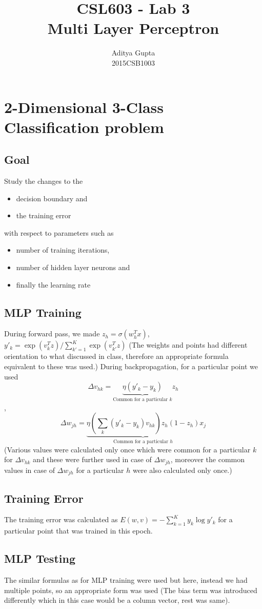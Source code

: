 \documentclass{article}
\title{CSL603 - Lab 3\\Multi Layer Perceptron}
\author{Aditya Gupta\\2015CSB1003}
\begin{document}
\maketitle
\section{2-Dimensional 3-Class Classification problem}
\subsection{Goal} Study the changes to the 
\begin{itemize}
\item decision boundary and 
\item the training error
\end{itemize} with respect to parameters such as 
\begin{itemize}
\item number of training iterations,
\item number of hidden layer neurons and
\item finally the learning rate
\end{itemize}
\subsection{MLP Training}
During forward pass, we made $z_h=\sigma(w_h^Tx)$, $y'_k=\exp(v_k^Tz)/\sum_{k'=1}^K \exp(v_{k'}^Tz)$ (The weights and points had different orientation to what discussed in class, therefore an appropriate formula equivalent to these was used.)
During backpropagation, for a particular point we used $$\Delta v_{hk}=\underbrace{\eta(y'_k-y_k)}_{\text{Common for a particular } k}z_h$$, $$\Delta w_{jh}=\underbrace{\eta\left(\sum_k(y'_k-y_k)v_{hk}\right)z_h(1-z_h)}_{\text{Common for a particular }h}x_j$$ (Various values were calculated only once which were common for a particular $k$ for $\Delta v_{hk}$ and these were further used in case of $\Delta w_{jh}$, moreover the common values in case of $\Delta w_{jh}$ for a particular $h$ were also calculated only once.)
\subsection{Training Error}
The training error was calculated as $E(w,v)=-\sum_{k=1}^K y_k\log y'_k$ for a particular point that was trained in this epoch.
\subsection{MLP Testing}
The similar formulas as for MLP training were used but here, instead we had multiple points, so an appropriate form was used (The bias term was introduced differently which in this case would be a column vector, rest was same).
\end{document}
